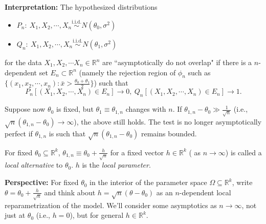 \documentclass[a4paper]{article}
\begin{document}
\noindent \textbf{Interpretation:} The hypothesized distributions 
\begin{itemize}
	\item $P_n: \ X_1,X_2,\cdots, X_n \stackrel{\text{i.i.d.}}{\sim} N(\theta_0,\sigma^2)$
	\item $Q_n: \ X_1,X_2,\cdots, X_n \stackrel{\text{i.i.d.}}{\sim} N(\theta_1,\sigma^2)$
\end{itemize}
	for the data $X_1,X_2,\cdots X_n \in \mathbb{R}^n$ are ``asymptotically do not overlap" if there is a $n$-dependent set $E_n \subset \mathbb{R}^n$ (namely the rejection region of $\phi_n$ such as $\{(x_1,x_2,\cdots,x_n): \bar{x} > \frac{\theta_0+\theta_1}{2}\}$) such that
	\begin{equation*}
		P_n\left[(X_1,X_2,\cdots,X_n) \in E_n \right] \to 0, \ Q_n\left[(X_1,X_2,\cdots,X_n) \in E_n \right] \to 1.
	\end{equation*}

\noindent Suppose now $\theta_0$ is fixed, but $\theta_1 \equiv \theta_{1,n}$ changes with $n$. If $\theta_{1,n} - \theta_0 \gg \frac{1}{\sqrt{n}}$ (i.e., $\sqrt{n}(\theta_{1,n}-\theta_0) \to \infty$), the above still holds. The test is no longer asymptotically perfect if $\theta_{1,n}$ is such that $\sqrt{n}(\theta_{1,n}-\theta_0)$ remains bounded.

\begin{defi}
	For fixed $\theta_0 \subseteq \mathbb{R}^k$, $\theta_{1,n} \equiv \theta_0 + \frac{h}{\sqrt{n}}$ for a fixed vector $h \in \mathbb{R}^k$ ( as $n \to \infty$) is called a \emph{local alternative} to $\theta_0$. $h$ is the \emph{local parameter}.
\end{defi}

\noindent \textbf{Perspective:} For fixed $\theta_0$ in the interior of the parameter space $\Omega \subseteq \mathbb{R}^k$, write $\theta = \theta_0 + \frac{h}{\sqrt{n}}$ and think about $h = \sqrt{n} (\theta - \theta_0)$ as an $n$-dependent local reparametrization of the model.  We'll consider some asymptotics as $n \to \infty$, not just at $\theta_0$ (i.e., $h=0$), but for general $h \in \mathbb{R}^k$.
\end{document}
